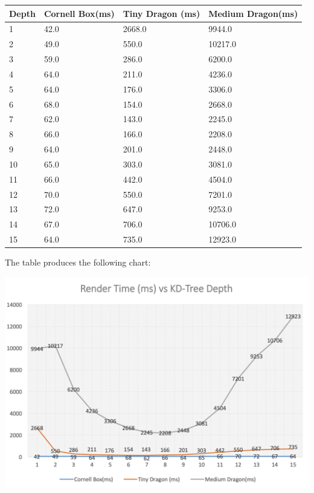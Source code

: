 \documentclass[letterpaper, 10 pt, conference]{ieeeconf}  %
\begin{document}
\begin{table}[H]

\begin{tabular}{@{}llll@{}}
\toprule
Depth & Cornell Box(ms) & Tiny Dragon (ms) & Medium Dragon(ms) \\ \midrule
1     & 42.0            & 2668.0           & 9944.0            \\
2     & 49.0            & 550.0            & 10217.0           \\
3     & 59.0            & 286.0            & 6200.0            \\
4     & 64.0            & 211.0            & 4236.0            \\
5     & 64.0            & 176.0            & 3306.0            \\
6     & 68.0            & 154.0            & 2668.0            \\
7     & 62.0            & 143.0            & 2245.0            \\
8     & 66.0            & 166.0            & 2208.0            \\
9     & 64.0            & 201.0            & 2448.0            \\
10    & 65.0            & 303.0            & 3081.0            \\
11    & 66.0            & 442.0            & 4504.0            \\
12    & 70.0            & 550.0            & 7201.0            \\
13    & 72.0            & 647.0            & 9253.0            \\
14    & 67.0            & 706.0            & 10706.0           \\
15    & 64.0            & 735.0            & 12923.0           \\ \bottomrule
\end{tabular}
\end{table}

The table produces the following chart:

\includegraphics[scale=1]{chart_1.png} 
\end{document}
